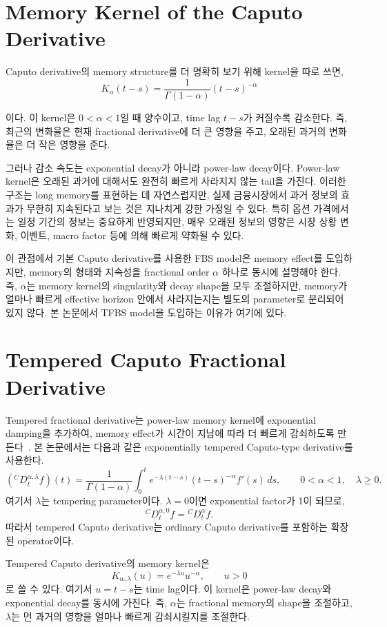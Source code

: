 \documentclass[11pt,a4paper]{report}
\begin{document}
\section{Memory Kernel of the Caputo Derivative}

Caputo derivative의 memory structure를 더 명확히 보기 위해 kernel을 따로 쓰면,
\[
K_{\alpha}(t-s)
=
\frac{1}{\Gamma(1-\alpha)}(t-s)^{-\alpha}
\]

이다. 이 kernel은 $0<\alpha<1$일 때 양수이고, time lag $t-s$가 커질수록 감소한다. 즉, 최근의 변화율은 현재 fractional derivative에 더 큰 영향을 주고, 오래된 과거의 변화율은 더 작은 영향을 준다.

그러나 감소 속도는 exponential decay가 아니라 power-law decay이다. Power-law kernel은 오래된 과거에 대해서도 완전히 빠르게 사라지지 않는 tail을 가진다. 이러한 구조는 long memory를 표현하는 데 자연스럽지만, 실제 금융시장에서 과거 정보의 효과가 무한히 지속된다고 보는 것은 지나치게 강한 가정일 수 있다. 특히 옵션 가격에서는 일정 기간의 정보는 중요하게 반영되지만, 매우 오래된 정보의 영향은 시장 상황 변화, 이벤트, macro factor 등에 의해 빠르게 약화될 수 있다.

이 관점에서 기본 Caputo derivative를 사용한 FBS model은 memory effect를 도입하지만, memory의 형태와 지속성을 fractional order $\alpha$ 하나로 동시에 설명해야 한다. 즉, $\alpha$는 memory kernel의 singularity와 decay shape을 모두 조절하지만, memory가 얼마나 빠르게 effective horizon 안에서 사라지는지는 별도의 parameter로 분리되어 있지 않다. 본 논문에서 TFBS model을 도입하는 이유가 여기에 있다.

\section{Tempered Caputo Fractional Derivative}

Tempered fractional derivative는 power-law memory kernel에 exponential damping을 추가하여, memory effect가 시간이 지남에 따라 더 빠르게 감쇠하도록 만든다~\cite{SabzikarMeerschaertChen2015}. 본 논문에서는 다음과 같은 exponentially tempered Caputo-type derivative를 사용한다.
\[
({}^C D_t^{\alpha,\lambda} f)(t)
=
\frac{1}{\Gamma(1-\alpha)}
\int_0^t
e^{-\lambda(t-s)}
(t-s)^{-\alpha}
f'(s)\,ds,
\qquad 0<\alpha<1,\quad \lambda\ge0.
\]
여기서 $\lambda$는 tempering parameter이다. $\lambda=0$이면 exponential factor가 1이 되므로,
\[
{}^C D_t^{\alpha,0}f
=
{}^C D_t^\alpha f.
\]
따라서 tempered Caputo derivative는 ordinary Caputo derivative를 포함하는 확장된 operator이다.

Tempered Caputo derivative의 memory kernel은
\[
K_{\alpha,\lambda}(u)
=
e^{-\lambda u}u^{-\alpha},
\qquad u>0
\]
로 쓸 수 있다. 여기서 $u=t-s$는 time lag이다. 이 kernel은 power-law decay와 exponential decay를 동시에 가진다. 즉, $\alpha$는 fractional memory의 shape을 조절하고, $\lambda$는 먼 과거의 영향을 얼마나 빠르게 감쇠시킬지를 조절한다.
\end{document}
